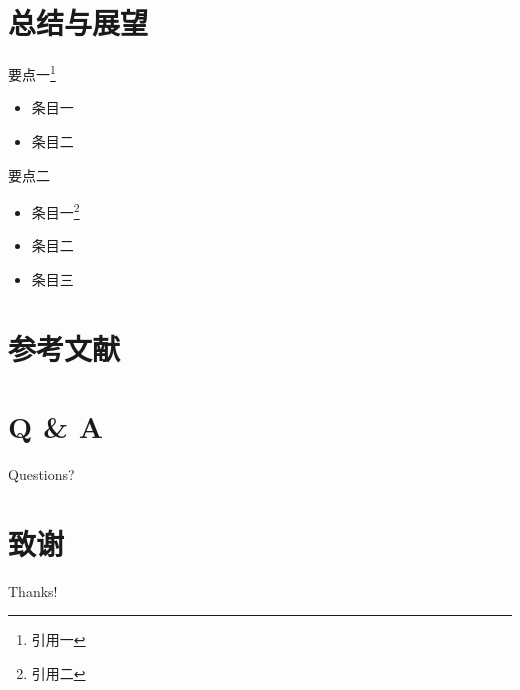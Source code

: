 \documentclass{sysupptthesis}
\begin{document}
\section{总结与展望}

\begin{frame}

    \begin{block}{要点一\footnote{引用一}}
        \begin{itemize}
            \item 条目一
            \item 条目二
        \end{itemize}
    \end{block}

    \begin{block}{要点二}
        \begin{itemize}
            \item 条目一\footnote{引用二}
            \item 条目二
            \item 条目三
        \end{itemize}
    \end{block}

\end{frame}

\section{参考文献}
\begin{frame}[allowframebreaks]
    \makereferences
\end{frame}

\section{Q \& A}

\begin{frame}

    \begin{block}{Questions?}
    \end{block}

\end{frame}

\section*{致谢}
\begin{frame}
    \begin{center}
        {\Huge\calligra Thanks!}
    \end{center}
\end{frame}
\end{document}
